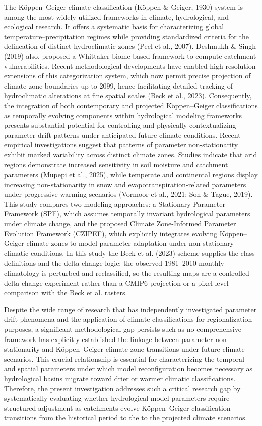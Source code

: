 \documentclass[
]{article}
\begin{document}
The Köppen--Geiger climate classification (Köppen \& Geiger, 1930)
system is among the most widely utilized frameworks in climate,
hydrological, and ecological research. It offers a systematic basis for
characterizing global temperature--precipitation regimes while providing
standardized criteria for the delineation of distinct hydroclimatic
zones (Peel et al., 2007). Deshmukh \& Singh (2019) also, proposed a
Whittaker biome‐based framework to compute catchment vulnerabilities.
Recent methodological developments have enabled high-resolution
extensions of this categorization system, which now permit precise
projection of climate zone boundaries up to 2099, hence facilitating
detailed tracking of hydroclimatic alterations at fine spatial scales
(Beck et al., 2023). Consequently, the integration of both contemporary
and projected Köppen--Geiger classifications as temporally evolving
components within hydrological modeling frameworks presents substantial
potential for controlling and physically contextualizing parameter drift
patterns under anticipated future climate conditions. Recent empirical
investigations suggest that patterns of parameter non-stationarity
exhibit marked variability across distinct climate zones. Studies
indicate that arid regions demonstrate increased sensitivity in soil
moisture and catchment parameters (Mupepi et al., 2025), while temperate
and continental regions display increasing non-stationarity in snow and
evapotranspiration-related parameters under progressive warming
scenarios (Vormoor et al., 2021; Son \& Tague, 2019). This study
compares two modeling approaches: a Stationary Parameter Framework
(SPF), which assumes temporally invariant hydrological parameters under
climate change, and the proposed Climate Zone-Informed Parameter
Evolution Framework (CZIPEF), which explicitly integrates evolving
Köppen--Geiger climate zones to model parameter adaptation under
non-stationary climatic conditions. In this study the Beck et al. (2023)
scheme supplies the class definitions and the delta-change logic: the
observed 1981--2010 monthly climatology is perturbed and reclassified,
so the resulting maps are a controlled delta-change experiment rather
than a CMIP6 projection or a pixel-level comparison with the Beck et al.
rasters.

Despite the wide range of research that has independently investigated
parameter drift phenomena and the application of climate classifications
for regionalization purposes, a significant methodological gap persists
such as no comprehensive framework has explicitly established the
linkage between parameter non-stationarity and Köppen--Geiger climate
zone transitions under future climate scenarios. This crucial
relationship is essential for characterizing the temporal and spatial
parameters under which model reconfiguration becomes necessary as
hydrological basins migrate toward drier or warmer climatic
classifications. Therefore, the present investigation addresses such a
critical research gap by systematically evaluating whether hydrological
model parameters require structured adjustment as catchments evolve
Köppen--Geiger classification transitions from the historical period to
the to the projected climate scenarios.
\end{document}
